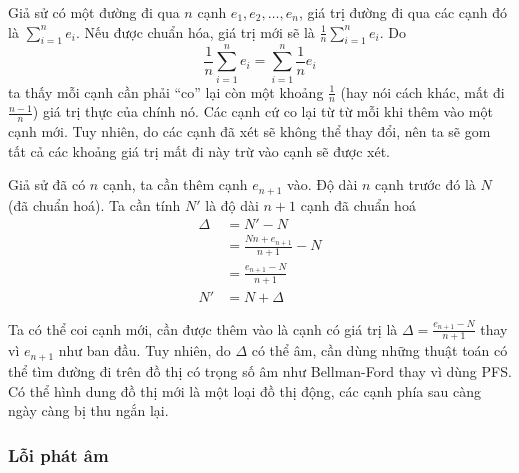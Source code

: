 \documentclass[a4paper,oneside,14pt]{extbook} %
\begin{document}
Giả sử có một đường đi qua $n$ cạnh $e_1,e_2,\ldots,e_n$, giá trị
đường đi qua các cạnh đó là $\sum_{i=1}^{n}e_i$. Nếu được chuẩn hóa,
giá trị mới sẽ là $\frac{1}{n}\sum_{i=1}^{n}e_i$. 
Do $$\frac{1}{n}\sum_{i=1}^{n}e_i=\sum_{i=1}^{n}\frac{1}{n}e_i$$ ta
thấy mỗi cạnh cần phải ``co'' lại còn một khoảng $\frac{1}{n}$ (hay
nói cách khác, mất đi $\frac{n-1}{n}$) giá trị
thực của chính nó. Các cạnh cứ co lại từ từ mỗi khi thêm vào một cạnh
mới. Tuy nhiên, do các cạnh đã xét sẽ không thể thay đổi, nên ta sẽ
gom tất cả các khoảng giá trị mất đi này trừ vào cạnh sẽ được xét.

Giả sử đã có $n$ cạnh, ta cần thêm cạnh $e_{n+1}$ vào. Độ dài $n$ cạnh
trước đó là $N$ (đã chuẩn hoá). Ta cần tính $N'$ là độ dài $n+1$ cạnh đã
chuẩn hoá
\begin{align*}
\Delta&=N'-N\\
      &=\frac{Nn+e_{n+1}}{n+1}-N\\
      &=\frac{e_{n+1}-N}{n+1}\\
N'&=N+\Delta
\end{align*}

Ta có thể coi cạnh mới, cần được thêm vào là cạnh có giá trị là
$\Delta=\frac{e_{n+1}-N}{n+1}$ thay vì $e_{n+1}$ như ban đầu. Tuy
nhiên, do $\Delta$ có thể âm, cần dùng những thuật toán có thể tìm
đường đi trên đồ thị có trọng số âm như Bellman-Ford thay vì dùng
PFS. Có thể hình dung đồ thị mới là một loại đồ thị động, các cạnh
phía sau càng ngày càng bị thu ngắn lại.


\subsubsection{Lỗi phát âm}
\label{sec:realword:recover:sound}
\end{document}
